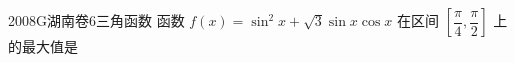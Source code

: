 
\begin{problem}{2008}{G}{湖南卷}{6}{三角函数}
函数 $f(x)=\sin^2x+\sqrt{3}\sin x\cos x$ 在区间 $\left[\dfrac{\pi}{4},\dfrac{\pi}{2}\right]$ 上的最大值是
\begin{choices}
\end{choices}
\end{problem}

\begin{answer}

\end{answer}

\begin{solutions}

\end{solutions}